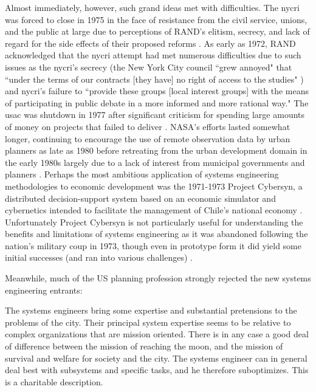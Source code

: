 Almost immediately, however, such grand ideas met with difficulties. The \ac{nycri} was forced to close in 1975 in the face of resistance from the civil service, unions, and the public at large due to perceptions of RAND's elitism, secrecy, and lack of regard for the side effects of their proposed reforms \cite{lightWarfareWelfareDefense2005}. As early as 1972, RAND acknowledged that the \ac{nycri} attempt had met numerous difficulties due to such issues as the \ac{nycri}'s secrecy (the New York City council ``grew annoyed" that ``under the terms of our contracts [they have] no right of access to the studies" \cite[\textsuperscript{(p159)}]{szantonAnalysisUrbanGovernment1972}) and \ac{nycri}'s failure to ``provide these groups [local interest groups] with the means of participating in public debate in a more informed and more rational way." \cite[\textsuperscript{(p161)}]{szantonAnalysisUrbanGovernment1972} The \ac{usac} was shutdown in 1977 after significant criticism for spending large amounts of money on projects that failed to deliver \cite{kraemerRequiemUSAC1979}. NASA's efforts lasted somewhat longer, continuing to encourage the use of remote observation data by urban planners as late as 1980 \cite{rushRemoteSensingUtility1976, haggertySpinoff19801980} before retreating from the urban development domain in the early 1980s largely due to a lack of interest from municipal governments and planners \cite{lightWarfareWelfareDefense2005}. Perhaps the most ambitious application of systems engineering methodologies to economic development was the 1971-1973 Project Cybersyn, a distributed decision-support system based on an economic simulator and cybernetics intended to facilitate the management of Chile's national economy \cite{medinaCyberneticRevolutionariesTechnology2011}. Unfortunately Project Cybersyn is not particularly useful for understanding the benefits and limitations of systems engineering as it was abandoned following the nation's military coup in 1973, though even in prototype form it did yield some initial successes (and ran into various challenges) \cite{medinaDesigningFreedomRegulating2006}. 

Meanwhile, much of the US planning profession strongly rejected the new systems engineering entrants:

\begin{singlespcquote}
The systems engineers bring some expertise and substantial pretensions to the problems of the city. Their principal system expertise seems to be relative to complex organizations that are mission oriented. There is in any case a good deal of difference between the mission of reaching the moon, and the mission of survival and welfare for society and the city. The systems engineer can in general deal best with subsystems and specific tasks, and he therefore suboptimizes. This is a charitable description. \cite{robinsonDecisionmakingUrbanPlanning1972}
\end{singlespcquote}

